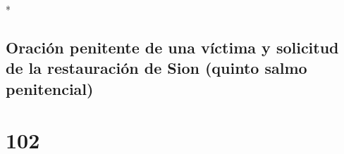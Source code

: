 \begin{paracol}{2}
\begin{otherlanguage}{english}
\end{otherlanguage}

\switchcolumn[0]*

\hypertarget{oraciuxf3n-penitente-de-una-vuxedctima-y-solicitud-de-la-restauraciuxf3n-de-sion-quinto-salmo-penitencial}{%
\subsection{Oración penitente de una víctima y solicitud de la
restauración de Sion (quinto salmo
penitencial)}\label{oraciuxf3n-penitente-de-una-vuxedctima-y-solicitud-de-la-restauraciuxf3n-de-sion-quinto-salmo-penitencial}}

\hypertarget{section-202}{%
\section{102}\label{section-202}}


\end{paracol}
